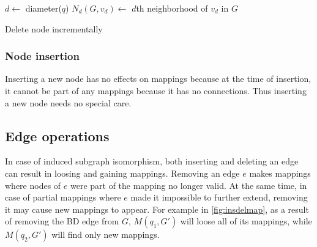 \begin{algorithm}[htp]
    \SetAlgoLined\DontPrintSemicolon
    \nl $d \gets $ diameter($q$)\;
    \nl $N_d(G, v_d) \gets$ $d$th neighborhood of $v_d$ in $G$\;
    \caption{Delete node incrementally}
\end{algorithm}

\subsubsection{Node insertion}

Inserting a new node has no effects on mappings because at the time of insertion,
it cannot be part of any mappings because it has no connections. Thus inserting a new node
needs no special care.

\subsection{Edge operations}

In case of induced subgraph isomorphism, both inserting and deleting an edge can result 
in loosing and gaining mappings. Removing an edge $e$ makes mappings where nodes of $e$
were part of the mapping no longer valid. At the same time, in case of partial mappings
where $e$ made it impossible to further extend, removing it may cause new mappings to
appear. For example in \ref{fig:insdelmap}, as a result of removing the BD edge from $G$,
$M(q_1, G')$ will loose all of its mappings, while $M(q_2, G')$ will find only new mappings. 

